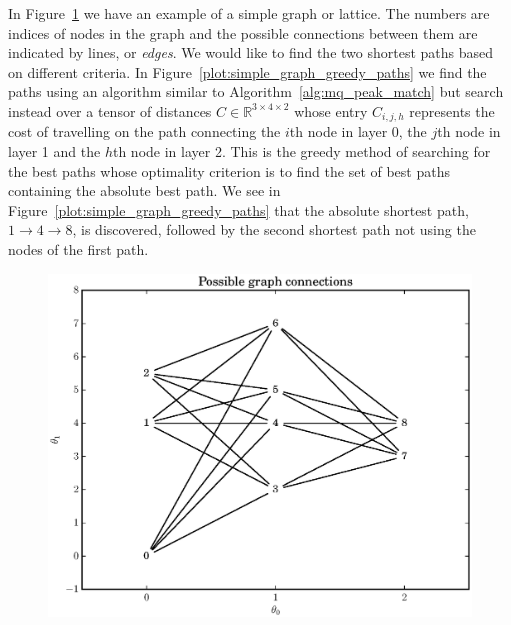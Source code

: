 In Figure~\ref{plot:simple_graph} we have an example of a simple graph or
lattice. The numbers are indices of nodes in the graph and the possible
connections between them are indicated by lines, or \textit{edges}. We would
like to find the two shortest paths based on different criteria. In
Figure~\ref{plot:simple_graph_greedy_paths} we find the paths using an algorithm
similar to Algorithm~\ref{alg:mq_peak_match} but search instead over a tensor of
distances $C \in \mathbb{R}^{3 \times 4 \times 2}$ whose entry $C_{i,j,h}$
represents the cost of travelling on the path connecting the $i$th node in layer
0, the $j$th node in layer 1 and the $h$th node in layer 2. This is the greedy
method of searching for the best paths whose optimality criterion is to find the
set of best paths containing the absolute best path. We see in
Figure~\ref{plot:simple_graph_greedy_paths} that the absolute shortest path, $1
\rightarrow 4 \rightarrow 8$, is discovered, followed by the second shortest
path not using the nodes of the first path.

\begin{figure}[!t]
    \caption{\label{plot:simple_graph}}
    \includegraphics[width=\textwidth]{plots/small_graph_ex.eps}
\end{figure}

